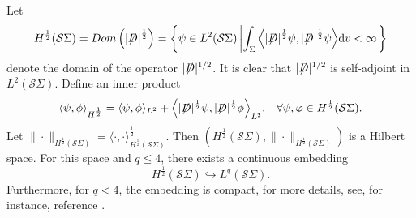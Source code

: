 \documentclass[a4paper, 12pt]{article}
\def\slashiii#1{\setbox0=\hbox{$#1$}#1\hskip-\wd0\hbox to\wd0{\hss\sl/\/\hss}}
\begin{document}
Let
$$
{H^{\frac{1}{2}}}(\mathcal{S}\Sigma) = Dom\left( {{{\left| \slashiii{D} \right|}^{\frac{1}{2}}}} \right) = \left\{ {\psi  \in {L^2}(\mathcal{S}\Sigma)\left| {\int_\Sigma {\left\langle {{{\left| \slashiii{D} \right|}^{\frac{1}{2}}}\psi ,{{\left| \slashiii{D} \right|}^{\frac{1}{2}}}\psi } \right\rangle } {\text{d}{v}} < \infty } \right.} \right\}
$$
denote the domain of the operator $|\slashiii{D}|^{1 / 2}$.  It is clear that $|\slashiii{D}|^{1 / 2}$ is self-adjoint in $L^2(\mathcal{S} \Sigma)$. Define an inner product
\begin{equation}\label{original_norm}
	{\langle \psi ,\phi \rangle _{{H^{\frac{1}{2}}}}} = {\langle \psi ,\phi \rangle _{{L^2}}} + {\left\langle {|\slashiii{D}{|^{\frac{1}{2}}}\psi ,|\slashiii{D}{|^{\frac{1}{2}}}\phi } \right\rangle _{{L^2}}}. \quad \forall \psi, \varphi \in H^{\frac{1}{2}}(\mathcal{S}\Sigma).
\end{equation}
Let $\|\cdot\|_{H^{\frac{1}{2}}(\mathcal{S}\Sigma)}=\langle  \cdot , \cdot \rangle _{{H^{\frac{1}{2}}}(\mathcal{S}\Sigma)}^{\frac{1}{2}}$. Then $(H^{\frac{1}{2}}(\mathcal{S}\Sigma),\|\cdot\|_{H^{\frac{1}{2}}(\mathcal{S}\Sigma)})$ is a Hilbert space. For this space and $q\leq 4$, there exists a continuous embedding
\begin{equation}\label{embedding}
	H^{\frac{1}{2}}(\mathcal{S}\Sigma) \hookrightarrow L^q(\mathcal{S}\Sigma).
\end{equation}
Furthermore, for \( q < 4 \), the embedding is compact, for more details, see, for instance, reference \cite{jevnikar2020existence1,MR4206467}.
\end{document}

